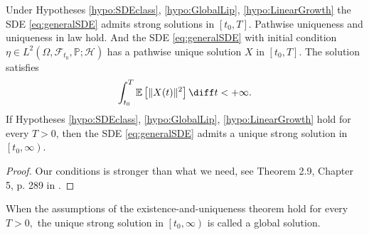 \begin{theorem}\label{thm:Main_theorem_solution}
Under Hypotheses \ref{hypo:SDEclass}, \ref{hypo:GlobalLip},  \ref{hypo:LinearGrowth} the SDE \eqref{eq:generalSDE} admits strong solutions in $ \left[  t_0, T\right] $. Pathwise uniqueness and uniqueness in law hold. And the SDE \eqref{eq:generalSDE} with initial condition $\eta \in L^{2}\left(\Omega, \mathcal{F}_{t_{0}}, \mathbb{P} ; \mathcal{H}\right)$ has a pathwise unique solution $X$ in $\left[t_{0}, T\right]$. The solution satisfies
\[ \int_{t_{0}}^{T} \mathbb{E}\left[\|X(t)\|^{2}\right] \diff t<+\infty .\]
If Hypotheses \ref{hypo:SDEclass},  \ref{hypo:GlobalLip}, \ref{hypo:LinearGrowth} hold for every $T>0$, then the SDE \eqref{eq:generalSDE} admits a unique strong solution in  $\left[ t_{0}, \infty\right) $.
\end{theorem}
\begin{proof}
	Our conditions is stronger than what we need, see Theorem 2.9, Chapter 5, p. 289 in \cite{KaratzasIoannisBmas}.
\end{proof}
When the assumptions of the existence-and-uniqueness theorem hold for every $T>0,$ the unique strong solution in $\left[t_{0}, \infty\right)$ is called a global solution.


